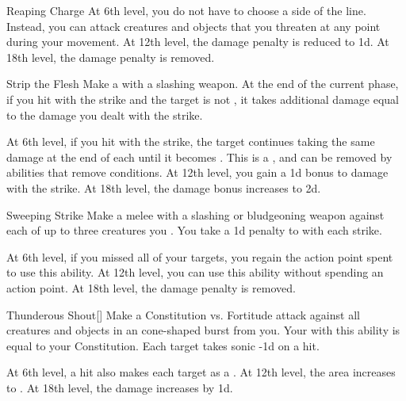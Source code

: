 {\begin{ability}{Reaping Charge}
                At 6th level, you do not have to choose a side of the line.
                Instead, you can attack creatures and objects that you threaten at any point during your movement.
                At 12th level, the damage penalty is reduced to \minus1d.
                At 18th level, the damage penalty is removed.
            \end{ability}

            \begin{ability}{Strip the Flesh}
                Make a  with a slashing weapon.
                At the end of the current phase, if you hit with the strike and the target is not , it takes additional damage equal to the damage you dealt with the strike.

                At 6th level, if you hit with the strike, the target continues taking the same damage at the end of each  until it becomes .
                This is a , and can be removed by abilities that remove conditions.
                At 12th level, you gain a \plus1d bonus to damage with the strike.
                At 18th level, the damage bonus increases to \plus2d.
            \end{ability}

            \begin{ability}{Sweeping Strike}
                Make a melee  with a slashing or bludgeoning weapon against each of up to three creatures you .
                You take a \minus1d penalty to  with each strike.

                At 6th level, if you missed all of your targets, you regain the action point spent to use this ability.
                At 12th level, you can use this ability without spending an action point.
                At 18th level, the damage penalty is removed.
            \end{ability}

            \begin{ability}{Thunderous Shout}[]
                Make a Constitution vs. Fortitude attack against all creatures and objects in an \areamed cone-shaped burst from you.
                Your  with this ability is equal to your Constitution.
                Each target takes sonic  -1d on a hit.

                At 6th level, a hit also makes each target  as a .
                At 12th level, the area increases to \arealarge.
                At 18th level, the damage increases by \plus1d.
            \end{ability}

}
